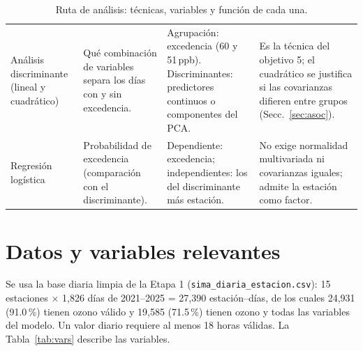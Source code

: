 \documentclass[11pt,letterpaper]{article}
\begin{document}
\begin{table}[h]
\begin{tabular}{@{}P{2.1cm}P{3.6cm}P{5.3cm}P{4.6cm}@{}}
An\'alisis discriminante (lineal y cuadr\'atico) & Qu\'e combinaci\'on de variables separa los d\'ias con y sin excedencia. & Agrupaci\'on: excedencia (60 y 51\,ppb). Discriminantes: predictores continuos o componentes del PCA. & Es la t\'ecnica del objetivo 5; el cuadr\'atico se justifica si las covarianzas difieren entre grupos (Secc.~\ref{sec:asoc}). \\
Regresi\'on log\'istica & Probabilidad de excedencia (comparaci\'on con el discriminante). & Dependiente: excedencia; independientes: los del discriminante m\'as estaci\'on. & No exige normalidad multivariada ni covarianzas iguales; admite la estaci\'on como factor. \\
\bottomrule
\end{tabular}
\caption{Ruta de an\'alisis: t\'ecnicas, variables y funci\'on de cada una.}
\label{tab:ruta}
\end{table}

\section{Datos y variables relevantes}
Se usa la base diaria limpia de la Etapa 1 (\texttt{sima\_diaria\_estacion.csv}): 15 estaciones $\times$ 1,826 d\'ias de 2021--2025 = 27,390 estaci\'on--d\'ias, de los cuales 24,931 (91.0\,\%) tienen ozono v\'alido y 19,585 (71.5\,\%) tienen ozono y todas las variables del modelo. Un valor diario requiere al menos 18 horas v\'alidas. La Tabla~\ref{tab:vars} describe las variables.
\end{document}
